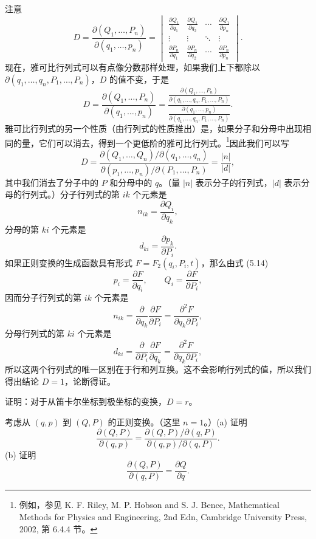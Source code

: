 注意
$$
D = \frac{\partial(Q_1, \dots, P_n)}{\partial(q_1, \dots, p_n)}
= \begin{vmatrix}
\frac{\partial Q_1}{\partial q_1} & \frac{\partial Q_1}{\partial q_2} & \cdots & \frac{\partial Q_1}{\partial p_n} \\
\vdots & \vdots & \ddots & \vdots \\
\frac{\partial P_n}{\partial q_1} & \frac{\partial P_n}{\partial q_2} & \cdots & \frac{\partial P_n}{\partial p_n}
\end{vmatrix}.
$$
现在，雅可比行列式可以有点像分数那样处理，如果我们上下都除以 $\partial(q_1, \dots, q_n, P_1, \dots, P_n)$，$D$ 的值不变，于是
$$
D = \frac{\partial(Q_1, \dots, P_n)}{\partial(q_1, \dots, p_n)}
= \frac{\frac{\partial(Q_1,\dots,P_n)}{\partial(q_1,\dots,q_n,P_1,\dots,P_n)}}{\frac{\partial(q_1,\dots,p_n)}{\partial(q_1,\dots,q_n,P_1,\dots,P_n)}}.
$$
雅可比行列式的另一个性质（由行列式的性质推出）是，如果分子和分母中出现相同的量，它们可以消去，得到一个更低阶的雅可比行列式。\footnote{例如，参见 K. F. Riley, M. P. Hobson and S. J. Bence, Mathematical Methods for Physics and Engineering, 2nd Edn, Cambridge University Press, 2002, 第 6.4.4 节。}因此我们可以写
$$
D = \frac{\partial(Q_1, \dots, Q_n)/\partial(q_1, \dots, q_n)}{\partial(p_1, \dots, p_n)/\partial(P_1, \dots, P_n)} = \frac{|n|}{|d|},
$$
其中我们消去了分子中的 $P$ 和分母中的 $q$。（量 $|n|$ 表示分子的行列式，$|d|$ 表示分母的行列式。）分子行列式的第 $ik$ 个元素是
$$
n_{ik} = \frac{\partial Q_i}{\partial q_k},
$$
分母的第 $ki$ 个元素是
$$
d_{ki} = \frac{\partial p_k}{\partial P_i}.
$$
如果正则变换的生成函数具有形式 $F = F_2(q_i, P_i, t)$，那么由式 (5.14)
$$
p_i = \frac{\partial F}{\partial q_i}, \qquad Q_i = \frac{\partial F}{\partial P_i},
$$
因而分子行列式的第 $ik$ 个元素是
$$
n_{ik} = \frac{\partial}{\partial q_k}\frac{\partial F}{\partial P_i} = \frac{\partial^2 F}{\partial q_k \partial P_i},
$$
分母行列式的第 $ki$ 个元素是
$$
d_{ki} = \frac{\partial}{\partial P_i}\frac{\partial F}{\partial q_k} = \frac{\partial^2 F}{\partial q_k \partial P_i},
$$
所以这两个行列式的唯一区别在于行和列互换。这不会影响行列式的值，所以我们得出结论 $D = 1$，论断得证。

\begin{exercise}
证明：对于从笛卡尔坐标到极坐标的变换，$D = r$。
\end{exercise}

\begin{exercise}
考虑从 $(q, p)$ 到 $(Q, P)$ 的正则变换。（这里 $n = 1$。）(a) 证明
$$
\frac{\partial(Q, P)}{\partial(q, p)} = \frac{\partial(Q, P)/\partial(q, P)}{\partial(q, p)/\partial(q, P)}.
$$
(b) 证明
$$
\frac{\partial(Q, P)}{\partial(q, P)} = \frac{\partial Q}{\partial q}.
$$
\end{exercise}


